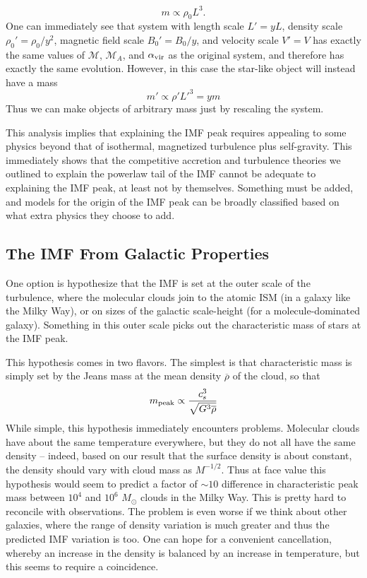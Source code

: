 \begin{equation}
m \propto \rho_0 L^3.
\end{equation}
One can immediately see that system with length scale $L' = y L$, density scale $\rho_0' = \rho_0 / y^2$, magnetic field scale $B_0' = B_0/y$, and velocity scale $V' = V$ has exactly the same values of $\mathcal{M}$, $\mathcal{M}_A$, and $\alpha_{\rm vir}$ as the original system, and therefore has exactly the same evolution. However, in this case the star-like object will instead have a mass
\begin{equation}
m' \propto \rho' L'^3 = y m
\end{equation}
Thus we can make objects of arbitrary mass just by rescaling the system.

This analysis implies that explaining the IMF peak requires appealing to some physics beyond that of isothermal, magnetized turbulence plus self-gravity. This immediately shows that the competitive accretion and turbulence theories we outlined to explain the powerlaw tail of the IMF cannot be adequate to explaining the IMF peak, at least not by themselves. Something must be added, and models for the origin of the IMF peak can be broadly classified based on what extra physics they choose to add.

\subsection{The IMF From Galactic Properties}

One option is hypothesize that the IMF is set at the outer scale of the turbulence, where the molecular clouds join to the atomic ISM (in a galaxy like the Milky Way), or on sizes of the galactic scale-height (for a molecule-dominated galaxy). Something in this outer scale picks out the characteristic mass of stars at the IMF peak.

This hypothesis comes in two flavors. The simplest is that characteristic mass is simply set by the Jeans mass at the mean density $\overline{\rho}$ of the cloud, so that
\begin{equation}
m_{\rm peak} \propto \frac{c_s^3}{\sqrt{G^3 \overline{\rho}}}
\end{equation}
While simple, this hypothesis immediately encounters problems. Molecular clouds have about the same temperature everywhere, but they do not all have the same density -- indeed, based on our result that the surface density is about constant, the density should vary with cloud mass as $M^{-1/2}$. Thus at face value this hypothesis would seem to predict a factor of $\sim 10$ difference in characteristic peak mass between $10^4$ and $10^6$ $M_\odot$ clouds in the Milky Way. This is pretty hard to reconcile with observations. The problem is even worse if we think about other galaxies, where the range of density variation is much greater and thus the predicted IMF variation is too. One can hope for a convenient cancellation, whereby an increase in the density is balanced by an increase in temperature, but this seems to require a coincidence.

